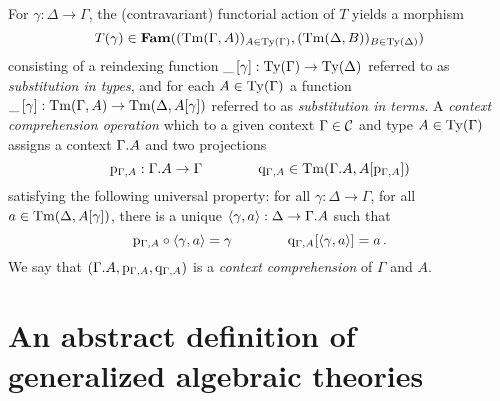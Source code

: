 \documentclass{lmcs}
\def\Obj{\mathrm{Obj}}
\begin{document}
\begin{definition}
For $\gamma : \Delta \to \Gamma$,
the (contravariant) functorial action of $T$ yields a morphism
\[
T(\gamma) \in  \Fam((\Tm(\Gamma, A))_{A\in \Ty(\Gamma)}, %
                (\Tm(\Delta, B))_{B\in \Ty(\Delta)})
\]
consisting of a reindexing function $\_\,[\gamma] : \mathrm{Ty}(\Gamma) \to
\mathrm{Ty}(\Delta)$ referred to as \emph{substitution in types}, and for each $A\in
\mathrm{Ty}(\Gamma)$ a function $\_\,[\gamma] : \mathrm{Tm}(\Gamma, A) \to \mathrm{Tm}(\Delta,
A[\gamma])$ referred to as \emph{substitution in terms}.
A \emph{context comprehension operation} which to a given context $\Gamma
\in {\mathcal C}$ and type $A \in \mathrm{Ty}(\Gamma)$ assigns a context $\Gamma .
A$ and two projections
\[
\mathrm{p}_{\Gamma, A} : \Gamma . A \to \Gamma
\qquad\qquad
\mathrm{q}_{\Gamma, A} \in \mathrm{Tm}(\Gamma. A, A[\mathrm{p}_{\Gamma,A}])
\] 
satisfying the following universal property: for all $\gamma : \Delta \to
\Gamma$, for all $a\in \mathrm{Tm}(\Delta, A[\gamma])$, there is a unique
$\langle \gamma, a \rangle : \Delta \to \Gamma . A$ such that
\[
\mathrm{p}_{\Gamma, A} \circ \langle \gamma, a \rangle = \gamma
\qquad \qquad
\mathrm{q}_{\Gamma, A} [\langle \gamma, a \rangle] = a\,.
\]
%
We say that $(\Gamma. A, \mathrm{p}_{\Gamma, A}, \mathrm{q}_{\Gamma, A})$ is a
\emph{context comprehension} of $\Gamma$ and $A$.

\end{definition}

\section{An abstract definition of generalized algebraic theories}
\end{document}
